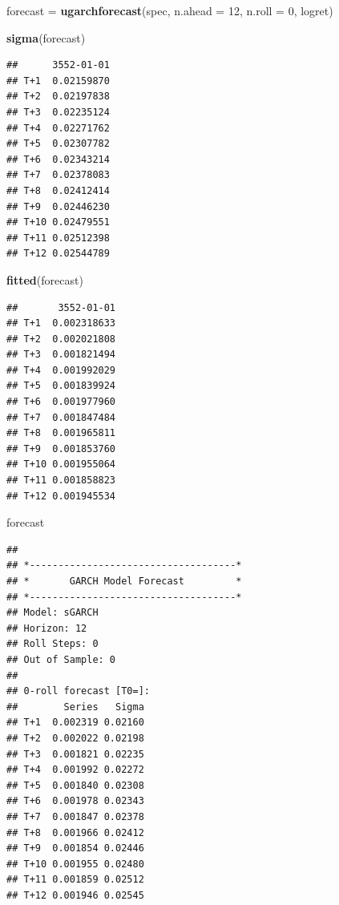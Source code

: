 \documentclass[
]{book}
\newenvironment{Shaded}{\begin{snugshade}}{\end{snugshade}}
\newcommand{\AttributeTok}[1]{\textcolor[rgb]{0.13,0.29,0.53}{#1}}
\newcommand{\DecValTok}[1]{\textcolor[rgb]{0.00,0.00,0.81}{#1}}
\newcommand{\FunctionTok}[1]{\textcolor[rgb]{0.13,0.29,0.53}{\textbf{#1}}}
\newcommand{\NormalTok}[1]{#1}
\newcommand{\OtherTok}[1]{\textcolor[rgb]{0.56,0.35,0.01}{#1}}
\begin{document}
\begin{Shaded}
\begin{Highlighting}[]
\NormalTok{forecast }\OtherTok{=} \FunctionTok{ugarchforecast}\NormalTok{(spec, }\AttributeTok{n.ahead =} \DecValTok{12}\NormalTok{, }\AttributeTok{n.roll =} \DecValTok{0}\NormalTok{, logret)}

\FunctionTok{sigma}\NormalTok{(forecast)}
\end{Highlighting}
\end{Shaded}

\begin{verbatim}
##      3552-01-01
## T+1  0.02159870
## T+2  0.02197838
## T+3  0.02235124
## T+4  0.02271762
## T+5  0.02307782
## T+6  0.02343214
## T+7  0.02378083
## T+8  0.02412414
## T+9  0.02446230
## T+10 0.02479551
## T+11 0.02512398
## T+12 0.02544789
\end{verbatim}

\begin{Shaded}
\begin{Highlighting}[]
\FunctionTok{fitted}\NormalTok{(forecast)}
\end{Highlighting}
\end{Shaded}

\begin{verbatim}
##       3552-01-01
## T+1  0.002318633
## T+2  0.002021808
## T+3  0.001821494
## T+4  0.001992029
## T+5  0.001839924
## T+6  0.001977960
## T+7  0.001847484
## T+8  0.001965811
## T+9  0.001853760
## T+10 0.001955064
## T+11 0.001858823
## T+12 0.001945534
\end{verbatim}

\begin{Shaded}
\begin{Highlighting}[]
\NormalTok{forecast}
\end{Highlighting}
\end{Shaded}

\begin{verbatim}
## 
## *------------------------------------*
## *       GARCH Model Forecast         *
## *------------------------------------*
## Model: sGARCH
## Horizon: 12
## Roll Steps: 0
## Out of Sample: 0
## 
## 0-roll forecast [T0=]:
##        Series   Sigma
## T+1  0.002319 0.02160
## T+2  0.002022 0.02198
## T+3  0.001821 0.02235
## T+4  0.001992 0.02272
## T+5  0.001840 0.02308
## T+6  0.001978 0.02343
## T+7  0.001847 0.02378
## T+8  0.001966 0.02412
## T+9  0.001854 0.02446
## T+10 0.001955 0.02480
## T+11 0.001859 0.02512
## T+12 0.001946 0.02545
\end{verbatim}
\end{document}
